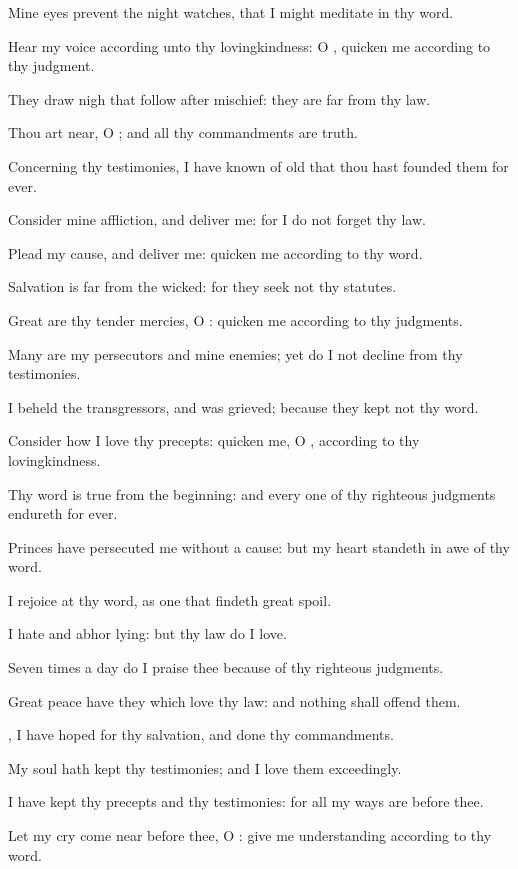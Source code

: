\verse Mine eyes prevent the night watches, that I might meditate in thy word.

\verse Hear my voice according unto thy lovingkindness: O \LORD, quicken me according to thy judgment.

\verse They draw nigh that follow after mischief: they are far from thy law.

\verse Thou art near, O \LORD; and all thy commandments are truth.

\verse Concerning thy testimonies, I have known of old that thou hast founded them for ever.

\verse Consider mine affliction, and deliver me: for I do not forget thy law.

\verse Plead my cause, and deliver me: quicken me according to thy word.

\verse Salvation is far from the wicked: for they seek not thy statutes.

\verse Great are thy tender mercies, O \LORD: quicken me according to thy judgments.

\verse Many are my persecutors and mine enemies; yet do I not decline from thy testimonies.

\verse I beheld the transgressors, and was grieved; because they kept not thy word.

\verse Consider how I love thy precepts: quicken me, O \LORD, according to thy lovingkindness.

\verse Thy word is true from the beginning: and every one of thy righteous judgments endureth for ever.

\verse Princes have persecuted me without a cause: but my heart standeth in awe of thy word.

\verse I rejoice at thy word, as one that findeth great spoil.

\verse I hate and abhor lying: but thy law do I love.

\verse Seven times a day do I praise thee because of thy righteous judgments.

\verse Great peace have they which love thy law: and nothing shall offend them.

\verse \LORD, I have hoped for thy salvation, and done thy commandments.

\verse My soul hath kept thy testimonies; and I love them exceedingly.

\verse I have kept thy precepts and thy testimonies: for all my ways are before thee.

\verse Let my cry come near before thee, O \LORD: give me understanding according to thy word.

